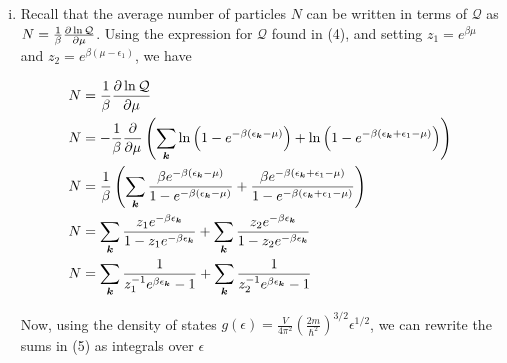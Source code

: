 \documentclass[]{article}
\begin{document}
\begin{enumerate}[1.]
\begin{enumerate}[i.]
\item Recall that the average number of particles $N$ can be written in terms of $\mathcal{Q}$ as $N = \frac{1}{\beta} \pdv{\ln\mathcal{Q}}{\mu}$. Using the expression for $\mathcal{Q}$ found in (4), and setting $z_1 = e^{\beta\mu}$ and $z_2 = e^{\beta(\mu - \epsilon_1)}$, we have

\begin{equation}
\begin{split}
N & = \frac{1}{\beta} \pdv{\ln\mathcal{Q}}{\mu} \\
N & = - \frac{1}{\beta} \pdv{\mu} \left( \sum_{\bm{k}} \ln\left(   1-  e^{-\beta(\epsilon_{\bm{k}} -\mu )} \right) + \ln\left(   1-  e^{-\beta(\epsilon_{\bm{k}} + \epsilon_1 -\mu )}   \right) \right) \\
N & =  \frac{1}{\beta} \left( \sum_{\bm{k}} \frac{  \beta e^{-\beta(\epsilon_{\bm{k}} -\mu )}  }{  1-  e^{-\beta(\epsilon_{\bm{k}} -\mu )} } + \frac{ \beta e^{-\beta(\epsilon_{\bm{k}} + \epsilon_1 -\mu )}  }{   1-  e^{-\beta(\epsilon_{\bm{k}} + \epsilon_1 -\mu )}   } \right) \\
N & = \sum_{\bm{k}} \frac{  z_1 e^{-\beta\epsilon_{\bm{k}}}  }{  1- z_1 e^{-\beta\epsilon_{\bm{k}}} } +  \sum_{\bm{k}}  \frac{ z_2 e^{-\beta\epsilon_{\bm{k}} }  }{   1-  z_2 e^{-\beta\epsilon_{\bm{k}} }   }  \\
N & = \sum_{\bm{k}} \frac{ 1 }{   z_1^{-1} e^{\beta\epsilon_{\bm{k}}}   - 1} +  \sum_{\bm{k}}  \frac{ 1 }{   z_2^{-1} e^{\beta\epsilon_{\bm{k}} }  -  1  }  \\
\end{split}
\end{equation}

Now, using the density of states $g(\epsilon) =  \frac{V}{4\pi^2} \left( \frac{2m}{\hbar^2} \right)^{3/2}\epsilon^{1/2}  $, we can rewrite the sums in (5) as integrals over $\epsilon$


\end{enumerate}
\end{enumerate}
\end{document}
